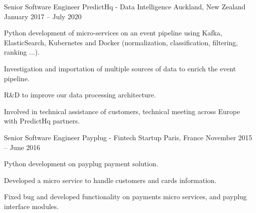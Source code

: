 

\begin{cventries}

  \cventry
    {Senior Software Engineer} %
    {PredictHq - Data Intelligence} %
    {Auckland, New Zealand} %
    {January 2017 – July 2020} %
    {
      \begin{cvitems} %
        \item {Python development of micro-services on an event pipeline using Kafka, ElasticSearch, Kubernetes and Docker (normalization, classification, filtering, ranking ...).}
        \item {Investigation and importation of multiple sources of data to enrich the event pipeline.}
        \item {R\&D to improve our data processing architecture.}
        \item {Involved in technical assistance of customers, technical meeting across Europe with PredictHq partners.}
      \end{cvitems}
    }

  \cventry
    {Senior Software Engineer} %
    {Payplug - Fintech Startup} %
    {Paris, France} %
    {November 2015 – June 2016} %
    {
      \begin{cvitems} %
        \item {Python development on payplug payment solution.}
        \item {Developed a micro service to handle customers and cards information.}
        \item {Fixed bug and developed functionality on payments micro services, and payplug interface modules.}
      \end{cvitems}
    }


\end{cventries}
